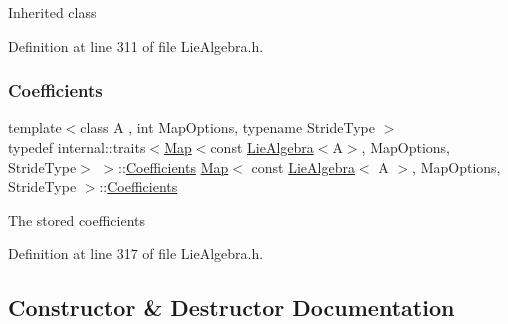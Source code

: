 Inherited class 

Definition at line 311 of file Lie\+Algebra.\+h.

\hypertarget{class_map_3_01const_01_lie_algebra_3_01_a_01_4_00_01_map_options_00_01_stride_type_01_4_a3173cdb7a49ee8a41f26cb0891740634}{}\label{class_map_3_01const_01_lie_algebra_3_01_a_01_4_00_01_map_options_00_01_stride_type_01_4_a3173cdb7a49ee8a41f26cb0891740634} 
\subsubsection{\texorpdfstring{Coefficients}{Coefficients}}
{\footnotesize\ttfamily template$<$class A , int Map\+Options, typename Stride\+Type $>$ \\
typedef internal\+::traits$<$\hyperlink{class_map_3_01const_01_lie_algebra_3_01_a_01_4_00_01_map_options_00_01_stride_type_01_4_a1f3c2cd540feb372191254760225bf1a}{Map}$<$const \hyperlink{class_lie_algebra}{Lie\+Algebra}$<$A$>$, Map\+Options, Stride\+Type$>$ $>$\+::\hyperlink{class_map_3_01const_01_lie_algebra_3_01_a_01_4_00_01_map_options_00_01_stride_type_01_4_a3173cdb7a49ee8a41f26cb0891740634}{Coefficients} \hyperlink{class_map_3_01const_01_lie_algebra_3_01_a_01_4_00_01_map_options_00_01_stride_type_01_4_a1f3c2cd540feb372191254760225bf1a}{Map}$<$ const \hyperlink{class_lie_algebra}{Lie\+Algebra}$<$ A $>$, Map\+Options, Stride\+Type $>$\+::\hyperlink{class_map_3_01const_01_lie_algebra_3_01_a_01_4_00_01_map_options_00_01_stride_type_01_4_a3173cdb7a49ee8a41f26cb0891740634}{Coefficients}}

The stored coefficients 

Definition at line 317 of file Lie\+Algebra.\+h.



\subsection{Constructor \& Destructor Documentation}
\hypertarget{class_map_3_01const_01_lie_algebra_3_01_a_01_4_00_01_map_options_00_01_stride_type_01_4_a1f3c2cd540feb372191254760225bf1a}{}\label{class_map_3_01const_01_lie_algebra_3_01_a_01_4_00_01_map_options_00_01_stride_type_01_4_a1f3c2cd540feb372191254760225bf1a} 
